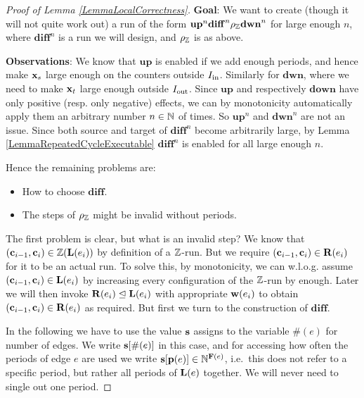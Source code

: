 \begin{proof}[Proof of Lemma \ref{LemmaLocalCorrectness}]
\textbf{Goal}: We want to create (though it will not quite work out) a run of the form \(\mathbf{up}^n \mathbf{diff}^n \rho_{\mathbb{Z}} \mathbf{dwn}^n\) for large enough \(n\), where \(\mathbf{diff}^n\) is a run we will design, and \(\rho_{\mathbb{Z}}\) is as above. 

\textbf{Observations}: We know that \(\mathbf{up}\) is enabled if we add enough periods, and hence make \(\mathbf{x}_s\) large enough on the counters outside \(I_{\text{in}}\). Similarly for \(\mathbf{dwn}\), where we need to make \(\mathbf{x}_t\) large enough outside \(I_{\text{out}}\). Since \(\mathbf{up}\) and respectively \(\mathbf{down}\) have only positive (resp. only negative) effects, we can by monotonicity automatically apply them an arbitrary number \(n\in \mathbb{N}\) of times. So \(\mathbf{up}^n\) and \(\mathbf{dwn}^n\) are not an issue. Since both source and target of \(\mathbf{diff}^n\) become arbitrarily large, by Lemma \ref{LemmaRepeatedCycleExecutable} \(\mathbf{diff}^n\) is enabled for all large enough \(n\).

Hence the remaining problems are:

\begin{itemize}
\item How to choose \(\mathbf{diff}\).
\item The steps of \(\rho_{\mathbb{Z}}\) might be invalid without periods.
\end{itemize}

The first problem is clear, but what is an invalid step? We know that \((\mathbf{c}_{i-1}, \mathbf{c}_i) \in \mathbb{Z}(\mathbf{L}(e_i))\) by definition of a \(\mathbb{Z}\)-run. But we require \((\mathbf{c}_{i-1}, \mathbf{c}_i) \in \mathbf{R}(e_i)\) for it to be an actual run. To solve this, by monotonicity, we can w.l.o.g. assume \((\mathbf{c}_{i-1}, \mathbf{c}_i) \in \mathbf{L}(e_i)\) by increasing every configuration of the \(\mathbb{Z}\)-run by enough. Later we will then invoke \(\mathbf{R}(e_i) \trianglelefteq \mathbf{L}(e_i)\) with appropriate \(\mathbf{w}(e_i)\) to obtain \((\mathbf{c}_{i-1}, \mathbf{c}_i) \in \mathbf{R}(e_i)\) as required. But first we turn to the construction of \(\mathbf{diff}\).

In the following we have to use the value \(\mathbf{s}\) assigns to the variable \(\#(e)\) for number of edges. We write \(\mathbf{s}[\#(e)]\) in this case, and for accessing how often the periods of edge \(e\) are used we write \(\mathbf{s}[\mathbf{p}(e)]\in \mathbb{N}^{\mathbf{F}(e)}\), i.e.\ this does not refer to a specific period, but rather all periods of \(\mathbf{L}(e)\) together. We will never need to single out one period.


\end{proof}

